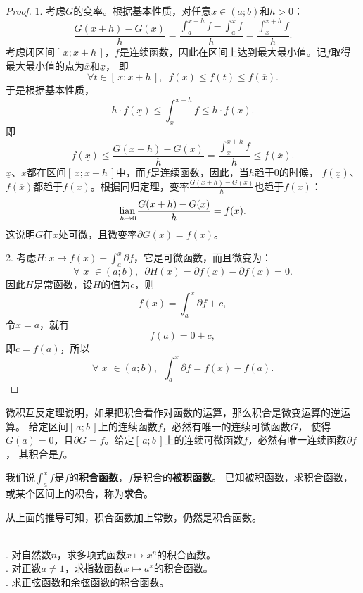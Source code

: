 \documentclass[12pt,UTF8,fontset=none]{ctexbook}
\begin{document}
\begin{proof}
    1. 考虑$G$的变率。根据基本性质，对任意$x\in(a; b)$和$h>0$：
    $$ \frac{G(x+h) - G(x)}{h} = \frac{\int_a^{x+h} f - \int_a^x f}{h} = \frac{\int_x^{x+h} f}{h}. $$
    考虑闭区间$[\,x; x+h\,]$，$f$是连续函数，因此在区间上达到最大最小值。记$f$取得最大最小值的点为$\overline{x}$和$\underline{x}$，
    即
    $$ \forall t \in [\,x; x+h\,] ,\,\,\, f(\underline{x}) \leqslant f(t) \leqslant f(\overline{x}). $$
    于是根据基本性质，
    $$ h\cdot f(\underline{x}) \leqslant \int_x^{x+h} f \leqslant h\cdot f(\overline{x}). $$
    即
    $$ f(\underline{x}) \leqslant \frac{G(x+h) - G(x)}{h} = \frac{\int_x^{x+h} f}{h} \leqslant f(\overline{x}). $$
    $\underline{x}$、$\overline{x}$都在区间$[\,x; x+h\,]$中，而$f$是连续函数，因此，当$h$趋于$0$的时候，
    $f(\underline{x})$、$f(\overline{x})$都趋于$f(x)$。根据同归定理，变率$\frac{G(x+h) - G(x)}{h}$也趋于$f(x)$：
    $$ \underset{h\to 0}{\operatorname{lian}\,} \frac{G(x+h) - G(x)}{h} = f(x).$$
    这说明$G$在$x$处可微，且微变率$\partial G (x) = f(x)$。

    2. 考虑$H: x\mapsto f(x) - \int_a^x \partial f$，它是可微函数，而且微变为：
    $$ \forall \,\, x\,\,\in(a; b), \,\,\, \partial H(x) = \partial f(x) - \partial f(x) = 0. $$
    因此$H$是常函数，设$H$的值为$c$，则
    $$f(x) = \int_a^x \partial f + c, $$
    令$x = a$，就有
    $$f(a) = 0 + c,$$
    即$c = f(a)$，所以
    $$ \forall \,\, x\,\,\in(a; b), \,\,\,\int_a^x \partial f = f(x) - f(a).$$

\end{proof}

微积互反定理说明，如果把积合看作对函数的运算，那么积合是微变运算的逆运算。
给定区间$[\,a; b\,]$上的连续函数$f$，必然有唯一的连续可微函数$G$，
使得$G(a) = 0$，且$\partial G = f$。给定$[\,a; b\,]$上的连续可微函数$f$，必然有唯一连续函数$\partial f$，
其积合是$f$。

我们说$\int_a^x f$是$f$的\textbf{积合函数}，$f$是积合的\textbf{被积函数}。
已知被积函数，求积合函数，或某个区间上的积合，称为\textbf{求合}。

从上面的推导可知，积合函数加上常数，仍然是积合函数。

\begin{et}
    \mbox{} \\
    . 对自然数$n$，求多项式函数$x\mapsto x^n$的积合函数。\\
    . 对正数$a\neq 1$，求指数函数$x\mapsto a^x$的积合函数。\\
    . 求正弦函数和余弦函数的积合函数。
\end{et}
\end{document}
